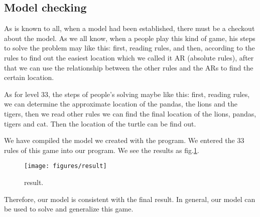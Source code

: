 \subsection{Model checking}
As is known to all, when a model had been established, there must be a checkout about the model. As we all know, when a people play this kind of game, his steps to solve the problem may like this: first, reading rules, and then, according to the rules to find out the easiest location which we called it AR (absolute rules), after that we can use the relationship between the other rules and the ARs to find the certain location.

As for level 33, the steps of people’s solving maybe like this: first, reading rules, we can determine the approximate location of the pandas, the lions and the tigers, then we read other rules we can find the final location of the lions, pandas, tigers and cat. Then the location of the turtle can be find out. 

We have compiled the model we created with the program. We entered the 33 rules of this game into our program. We see the results as fig.\ref{fig:result}.
\begin{figure}[h]
	\centering 
	\texttt{[image: figures/result]} 
	\caption{result.}
	\label{fig:result}   
\end{figure}

Therefore, our model is consistent with the final result. In general, our model can be used to solve and generalize this game.
